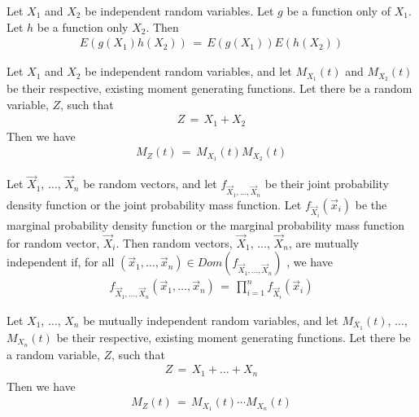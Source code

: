 \begin{theorem}
    Let $X_{1}$ and $X_{2}$ be independent random variables. Let $g$ be a function only of $X_{1}$. Let $h$ be a function only $X_{2}$. Then
    \begin{align*}
        E(g(X_{1}) h(X_{2})) \hspace{2pt} = \hspace{2pt} E(g(X_{1})) E(h(X_{2}))
    \end{align*}
\end{theorem}

\begin{theorem}
    Let $X_{1}$ and $X_{2}$ be independent random variables, and let $M_{X_{1}}(t)$ and $M_{X_{2}}(t)$ be their respective, existing moment generating functions. Let there be a random variable, $Z$, such that
    \begin{align*}
        Z \hspace{2pt} = \hspace{2pt} X_{1} + X_{2}
    \end{align*}
    Then we have
    \begin{align*}
        M_{Z}(t) \hspace{2pt} = \hspace{2pt} M_{X_{1}}(t) M_{X_{2}}(t)
    \end{align*}
\end{theorem}

\begin{definition}
    Let $\vec{X}_{1}$, $\dots$, $\vec{X}_{n}$ be random vectors, and let $f_{\vec{X}_{1}, \dots , \vec{X}_{n}}$ be their joint probability density function or the joint probability mass function. Let $f_{\vec{X}_{i}}(\vec{x}_{i})$ be the marginal probability density function or the marginal probability mass function for random vector, $\vec{X}_{i}$. Then random vectors, $\vec{X}_{1}$, $\dots$, $\vec{X}_{n}$, are mutually independent if, for all $(\vec{x}_{1}, \dots , \vec{x}_{n}) \in Dom(f_{\vec{X}_{1}, \dots , \vec{X}_{n}})$ , we have
    \begin{align*}
        f_{\vec{X}_{1}, \dots , \vec{X}_{n}}(\vec{x}_{1}, \dots , \vec{x}_{n}) \hspace{2pt} = \hspace{2pt} \prod_{i = 1}^{n} f_{\vec{X}_{i}}(\vec{x}_{i})
    \end{align*}
\end{definition}

\begin{theorem}
    Let $X_{1}$, $\dots$, $X_{n}$ be mutually independent random variables, and let $M_{X_{1}}(t)$, $\dots$, $M_{X_{n}}(t)$ be their respective, existing moment generating functions. Let there be a random variable, $Z$, such that
    \begin{align*}
        Z \hspace{2pt} = \hspace{2pt} X_{1} + \dots + X_{n}
    \end{align*}
    Then we have
    \begin{align*}
        M_{Z}(t) \hspace{2pt} = \hspace{2pt} M_{X_{1}}(t) \cdots M_{X_{n}}(t)
    \end{align*}
\end{theorem}